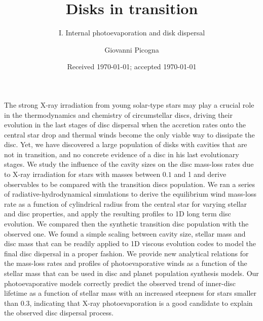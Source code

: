 \documentclass{aa}
\begin{document}
   \title{Disks in transition}

   \subtitle{I. Internal photoevaporation and disk dispersal}

   \author{Giovanni Picogna }


   \date{Received \today; accepted \today}

   \abstract
      {The strong X-ray irradiation from young solar-type stars may play a crucial role in the thermodynamics and chemistry of circumstellar discs, driving their evolution in the last stages of disc dispersal when the accretion rates onto the central star drop and thermal winds become the only viable way to dissipate the disc. Yet, we have discovered a large population of disks with cavities that are not in transition, and no concrete evidence of a disc in his last evolutionary stages.}
      {We study the influence of the cavity sizes on the disc mass-loss rates due to X-ray irradiation for stars with masses between $0.1$ and \SI{1}{\solarmass} and derive observables to be compared with the transition discs population.}
      {We ran a series of radiative-hydrodynamical simulations to derive the equilibrium wind mass-loss rate as a function of cylindrical radius from the central star for varying stellar and disc properties, and apply the resulting profiles to 1D long term disc evolution. We compared then the synthetic transition disc population with the observed one.}
      {We  found a simple scaling between cavity size, stellar mass and disc mass that can be readily applied to 1D viscous evolution codes to model the final disc dispersal in a proper fashion.}
      {We provide new analytical relations for the mass-loss rates and profiles of photoevaporative winds as a function of the stellar mass that can be used in disc and planet population synthesis models. Our photoevaporative models correctly predict the observed trend of inner-disc lifetime as a function of stellar mass with an increased steepness for stars smaller than \SI{0.3}{\solarmass}, indicating that X-ray photoevaporation is a good candidate to explain the observed disc dispersal process.}

   \keywords{}

   \maketitle
\end{document}
